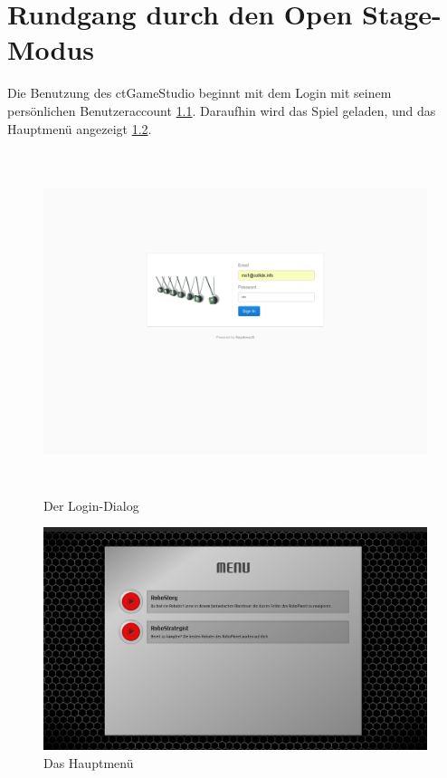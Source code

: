 \chapter{Rundgang durch den Open Stage-Modus}

Die Benutzung des ctGameStudio beginnt mit dem Login mit seinem persönlichen Benutzeraccount
\ref{login}. Daraufhin wird das Spiel geladen, und das Hauptmenü angezeigt \ref{main-menu}.

\begin{figure}
  \centering
  \label{login}
  \includegraphics[width=15cm, height=10cm, keepaspectratio]{figures/1-login.png}
  \caption{Der Login-Dialog}
\end{figure}

\begin{figure}
  \centering
  \label{main-menu}
  \includegraphics[width=15cm, keepaspectratio]{figures/2-main-menu.png}
  \caption{Das Hauptmenü}
\end{figure}

